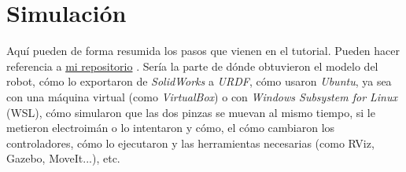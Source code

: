 \section{Simulación} \label{sec:simulacion}
Aquí pueden de forma resumida los pasos que vienen en el tutorial. Pueden hacer referencia a \href{https://github.com/IvanMedinaGL/Robotica}{mi repositorio} \cite{medinagl_robotica}. Sería la parte de dónde obtuvieron el modelo del robot, cómo lo exportaron de \textit{SolidWorks} a \textit{URDF}, cómo usaron \textit{Ubuntu}, ya sea con una máquina virtual (como \textit{VirtualBox}) o con \textit{Windows Subsystem for Linux} (WSL), cómo simularon que las dos pinzas se muevan al mismo tiempo, si le metieron electroimán o lo intentaron y cómo, el cómo cambiaron los controladores, cómo lo ejecutaron y las herramientas necesarias (como RViz, Gazebo, MoveIt...), etc.